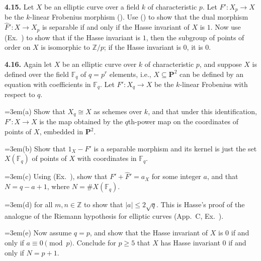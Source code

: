 {\smallskip
\noindent\hypertarget{ex-IV-4.15}{}\textbf{4.15.} Let $X$ be an elliptic curve over a field $k$ of characteristic $p$. Let $F'\colon X_p\to X$ be the $k$-linear Frobenius morphism (). Use () to show that the dual morphism $\widehat F'\colon X\to X_p$ is separable if and only if the Hasse invariant of $X$ is $1$. Now use (Ex.~) to show that if the Hasse invariant is $1$, then the subgroup of points of order  on $X$ is isomorphic to $\mathbb Z/p$; if the Hasse invariant is $0$, it is $0$.

\smallskip
\noindent\hypertarget{ex-IV-4.16}{}\textbf{4.16.} Again let $X$ be an elliptic curve over $k$ of characteristic $p$, and suppose $X$ is defined over the field $\mathbb F_q$ of $q=p^r$ elements, i.e., $X\subseteq\mathbf P^2$ can be defined by an equation with coefficients in $\mathbb F_q$.  Let $F'\colon X_q\to X$ be the $k$-linear Frobenius with respect to $q$.

\noindent\hangindent=3em\hspace*{1.7em}(a) Show that $X_q\cong X$ as schemes over $k$, and that under this identification, $F'\colon X\to X$ is the map obtained by the $q$th-power map on the coordinates of points of $X$, embedded in $\mathbf P^2$.

\noindent\hangindent=3em\hspace*{1.7em}(b) Show that $1_X-F'$ is a separable morphism and its kernel is just the set $X(\mathbb F_q)$ of points of $X$ with coordinates in $\mathbb F_q$.

\noindent\hangindent=3em\hspace*{1.7em}(c) Using (Ex.~), show that $F'+\widehat F'=a_X$ for some integer $a$, and that $N=q-a+1$, where $N=\#X(\mathbb F_q)$.

\noindent\hangindent=3em\hspace*{1.7em}\hypertarget{ex-IV-4.16d}{}(d)  for all $m,n\in\mathbb Z$ to show that $|a|\le2\sqrt q$. This is Hasse's proof of the analogue of the Riemann hypothesis for elliptic curves (App.~C, Ex.~).

\noindent\hangindent=3em\hspace*{1.7em}(e) Now assume $q=p$, and show that the Hasse invariant of $X$ is $0$ if and only if $a\equiv0\pmod p$. Conclude for $p\ge5$ that $X$ has Hasse invariant $0$ if and only if $N=p+1$.

}
